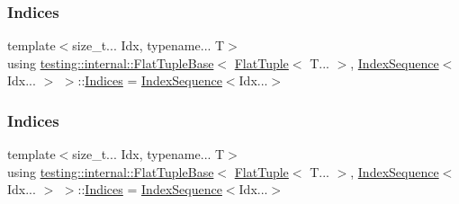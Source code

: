 \subsubsection{\texorpdfstring{Indices}{Indices}\hspace{0.1cm}{\footnotesize\ttfamily [1/2]}}
{\footnotesize\ttfamily template$<$size\+\_\+t... Idx, typename... T$>$ \\
using \mbox{\hyperlink{structtesting_1_1internal_1_1_flat_tuple_base}{testing\+::internal\+::\+Flat\+Tuple\+Base}}$<$ \mbox{\hyperlink{classtesting_1_1internal_1_1_flat_tuple}{Flat\+Tuple}}$<$ T... $>$, \mbox{\hyperlink{structtesting_1_1internal_1_1_index_sequence}{Index\+Sequence}}$<$ Idx... $>$ $>$\+::\mbox{\hyperlink{structtesting_1_1internal_1_1_flat_tuple_base_3_01_flat_tuple_3_01_t_8_8_8_01_4_00_01_index_sequence_3_01_idx_8_8_8_01_4_01_4_ada1941ebde1ec1c844b72970e0ccb304}{Indices}} =  \mbox{\hyperlink{structtesting_1_1internal_1_1_index_sequence}{Index\+Sequence}}$<$Idx...$>$}

\mbox{\label{structtesting_1_1internal_1_1_flat_tuple_base_3_01_flat_tuple_3_01_t_8_8_8_01_4_00_01_index_sequence_3_01_idx_8_8_8_01_4_01_4_ada1941ebde1ec1c844b72970e0ccb304}} 
\subsubsection{\texorpdfstring{Indices}{Indices}\hspace{0.1cm}{\footnotesize\ttfamily [2/2]}}
{\footnotesize\ttfamily template$<$size\+\_\+t... Idx, typename... T$>$ \\
using \mbox{\hyperlink{structtesting_1_1internal_1_1_flat_tuple_base}{testing\+::internal\+::\+Flat\+Tuple\+Base}}$<$ \mbox{\hyperlink{classtesting_1_1internal_1_1_flat_tuple}{Flat\+Tuple}}$<$ T... $>$, \mbox{\hyperlink{structtesting_1_1internal_1_1_index_sequence}{Index\+Sequence}}$<$ Idx... $>$ $>$\+::\mbox{\hyperlink{structtesting_1_1internal_1_1_flat_tuple_base_3_01_flat_tuple_3_01_t_8_8_8_01_4_00_01_index_sequence_3_01_idx_8_8_8_01_4_01_4_ada1941ebde1ec1c844b72970e0ccb304}{Indices}} =  \mbox{\hyperlink{structtesting_1_1internal_1_1_index_sequence}{Index\+Sequence}}$<$Idx...$>$}



